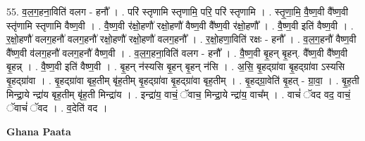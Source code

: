 \documentclass[17pt]{extarticle}
\begin{document}
55. व॒ल॒ग॒हना॒विति॑ वलग - हनौ᳚ । . परि॑ स्तृणामि स्तृणामि॒ परि॒ परि॑ स्तृणामि । . स्तृ॒णा॒मि॒ वै॒ष्ण॒वी वै᳚ष्ण॒वी स्तृ॑णामि स्तृणामि वैष्ण॒वी । . वै॒ष्ण॒वी र॑क्षो॒हणौ॑ रक्षो॒हणौ॑ वैष्ण॒वी वै᳚ष्ण॒वी र॑क्षो॒हणौ᳚ । . वै॒ष्ण॒वी इति॑ वैष्ण॒वी । . र॒क्षो॒हणौ॑ वलग॒हनौ॑ वलग॒हनौ॑ रक्षो॒हणौ॑ रक्षो॒हणौ॑ वलग॒हनौ᳚ । . र॒क्षो॒हणा॒विति॑ रक्षः - हनौ᳚ । . व॒ल॒ग॒हनौ॑ वैष्ण॒वी वै᳚ष्ण॒वी व॑लग॒हनौ॑ वलग॒हनौ॑ वैष्ण॒वी । . व॒ल॒ग॒हना॒विति॑ वलग - हनौ᳚ । . वै॒ष्ण॒वी बृ॒हन् बृ॒हन्. वै᳚ष्ण॒वी वै᳚ष्ण॒वी बृ॒हन्न् । . वै॒ष्ण॒वी इति॑ वैष्ण॒वी । . बृ॒हन् न॑स्यसि बृ॒हन् बृ॒हन् न॑सि । . अ॒सि॒ बृ॒हद्ग्रा॑वा बृ॒हद्ग्रा॑वा ऽस्यसि बृ॒हद्ग्रा॑वा । . बृ॒हद्ग्रा॑वा बृह॒तीम् बृ॑ह॒तीम् बृ॒हद्ग्रा॑वा बृ॒हद्ग्रा॑वा बृह॒तीम् । . बृ॒हद्ग्रा॒वेति॑ बृ॒हत् - ग्रा॒वा॒ । . बृ॒ह॒ती मिन्द्रा॒ये न्द्रा॑य बृह॒तीम् बृ॑ह॒ती मिन्द्रा॑य । . इन्द्रा॑य॒ वाचं॒ ॅवाच॒ मिन्द्रा॒ये न्द्रा॑य॒ वाच᳚म् । . वाचं॑ ॅवद वद॒ वाचं॒ ॅवाचं॑ ॅवद । . व॒देति॑ वद । \newline

\textbf{Ghana Paata } \newline
\end{document}
